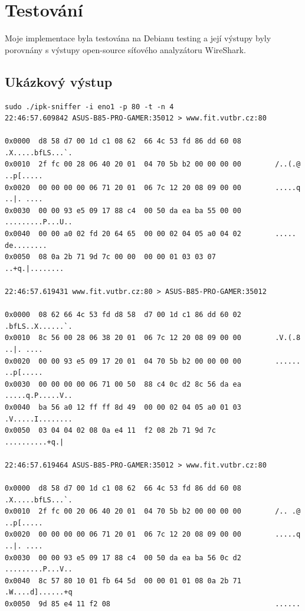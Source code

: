 \documentclass[12pt]{article}
\begin{document}
    \newpage

    \section{Testování}\label{sec:testování}

    Moje implementace byla testována na Debianu testing a její výstupy byly porovnány s výstupy open-source síťového analyzátoru WireShark\cite{wireshark}.

    \subsection{Ukázkový výstup}

    \begin{verbatim}
sudo ./ipk-sniffer -i eno1 -p 80 -t -n 4
22:46:57.609842 ASUS-B85-PRO-GAMER:35012 > www.fit.vutbr.cz:80

0x0000  d8 58 d7 00 1d c1 08 62  66 4c 53 fd 86 dd 60 08        .X.....bfLS...`.
0x0010  2f fc 00 28 06 40 20 01  04 70 5b b2 00 00 00 00        /..(.@ ..p[.....
0x0020  00 00 00 00 06 71 20 01  06 7c 12 20 08 09 00 00        .....q ..|. ....
0x0030  00 00 93 e5 09 17 88 c4  00 50 da ea ba 55 00 00        .........P...U..
0x0040  00 00 a0 02 fd 20 64 65  00 00 02 04 05 a0 04 02        ..... de........
0x0050  08 0a 2b 71 9d 7c 00 00  00 00 01 03 03 07              ..+q.|........

22:46:57.619431 www.fit.vutbr.cz:80 > ASUS-B85-PRO-GAMER:35012

0x0000  08 62 66 4c 53 fd d8 58  d7 00 1d c1 86 dd 60 02        .bfLS..X......`.
0x0010  8c 56 00 28 06 38 20 01  06 7c 12 20 08 09 00 00        .V.(.8 ..|. ....
0x0020  00 00 93 e5 09 17 20 01  04 70 5b b2 00 00 00 00        ...... ..p[.....
0x0030  00 00 00 00 06 71 00 50  88 c4 0c d2 8c 56 da ea        .....q.P.....V..
0x0040  ba 56 a0 12 ff ff 8d 49  00 00 02 04 05 a0 01 03        .V.....I........
0x0050  03 04 04 02 08 0a e4 11  f2 08 2b 71 9d 7c              ..........+q.|

22:46:57.619464 ASUS-B85-PRO-GAMER:35012 > www.fit.vutbr.cz:80

0x0000  d8 58 d7 00 1d c1 08 62  66 4c 53 fd 86 dd 60 08        .X.....bfLS...`.
0x0010  2f fc 00 20 06 40 20 01  04 70 5b b2 00 00 00 00        /.. .@ ..p[.....
0x0020  00 00 00 00 06 71 20 01  06 7c 12 20 08 09 00 00        .....q ..|. ....
0x0030  00 00 93 e5 09 17 88 c4  00 50 da ea ba 56 0c d2        .........P...V..
0x0040  8c 57 80 10 01 fb 64 5d  00 00 01 01 08 0a 2b 71        .W....d]......+q
0x0050  9d 85 e4 11 f2 08                                       ......


\end{verbatim}
\end{document}
